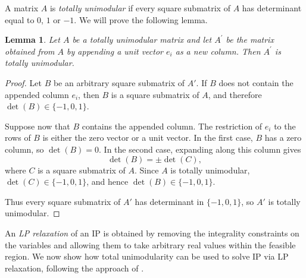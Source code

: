 \documentclass[12pt]{report}
\newtheorem{llemma}[base]{Lemma}
\numberwithin{algorithm}{chapter}
\begin{document}
	A matrix $A$ is \emph{totally unimodular} if every square submatrix of $A$ has determinant equal to $0$, $1$ or $-1$. We will prove the following lemma.
	\begin{llemma}
		Let $A$ be a totally unimodular matrix and let $A^{'}$ be the matrix obtained from $A$ by appending a unit vector \(e_i\) as a new column. Then $A^{'}$ is totally unimodular.
	\end{llemma}
	\begin{proof}
		Let $B$ be an arbitrary square submatrix of $A'$. If $B$ does not contain the appended column $e_i$, then $B$ is a square submatrix of $A$, and therefore $\det(B)\in\{-1,0,1\}$.
		
		Suppose now that $B$ contains the appended column. The restriction of $e_i$ to the rows of $B$ is either the zero vector or a unit vector. In the first case, $B$ has a zero column, so $\det(B)=0$. In the second case, expanding along this column gives
		\[
		\det(B)=\pm \det(C),
		\]
		where $C$ is a square submatrix of $A$. Since $A$ is totally unimodular, $\det(C)\in\{-1,0,1\}$, and hence $\det(B)\in\{-1,0,1\}$.
		
		Thus every square submatrix of $A'$ has determinant in $\{-1,0,1\}$, so $A'$ is totally unimodular.
	\end{proof}
	
	An \emph{LP relaxation} of an IP is obtained by removing the integrality constraints on the variables and allowing them to take arbitrary real values within the feasible region.
	We now show how total unimodularity can be used to solve IP via LP relaxation, following the approach of \cite[p.~145]{matousek2007understanding}.
	
\end{document}
